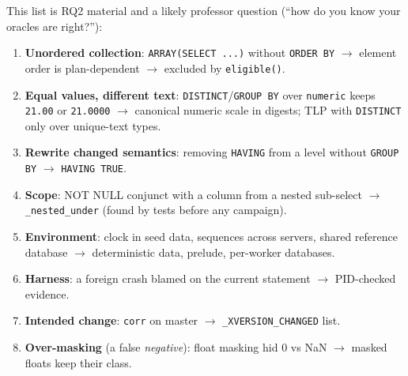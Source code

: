 This list is RQ2 material and a likely professor question (``how do you know
your oracles are right?''):
\begin{enumerate}
  \item \textbf{Unordered collection}: \texttt{ARRAY(SELECT ...)} without
    \texttt{ORDER BY} $\rightarrow$ element order is plan-dependent
    $\rightarrow$ excluded by \texttt{eligible()}.
  \item \textbf{Equal values, different text}: \texttt{DISTINCT}/\texttt{GROUP
    BY} over \texttt{numeric} keeps \texttt{21.00} or \texttt{21.0000}
    $\rightarrow$ canonical numeric scale in digests; TLP with
    \texttt{DISTINCT} only over unique-text types.
  \item \textbf{Rewrite changed semantics}: removing \texttt{HAVING} from a
    level without \texttt{GROUP BY} $\rightarrow$ \texttt{HAVING TRUE}.
  \item \textbf{Scope}: NOT NULL conjunct with a column from a nested
    sub-select $\rightarrow$ \texttt{\_nested\_under} (found by tests before
    any campaign).
  \item \textbf{Environment}: clock in seed data, sequences across servers,
    shared reference database $\rightarrow$ deterministic data, prelude,
    per-worker databases.
  \item \textbf{Harness}: a foreign crash blamed on the current statement
    $\rightarrow$ PID-checked evidence.
  \item \textbf{Intended change}: \texttt{corr} on master $\rightarrow$
    \texttt{\_XVERSION\_CHANGED} list.
  \item \textbf{Over-masking} (a false \emph{negative}): float masking hid
    0 vs NaN $\rightarrow$ masked floats keep their class.
\end{enumerate}
